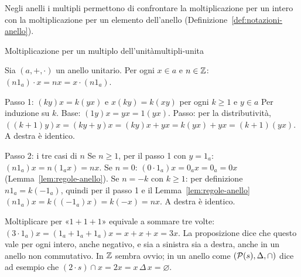 Negli anelli i multipli permettono di confrontare la moltiplicazione per un intero con la moltiplicazione per un elemento
dell'anello (Definizione~\ref{def:notazioni-anello}).

\begin{concetto}
\begin{Proposizione}{Moltiplicazione per un multiplo dell'unità}{multipli-unita}
    \begin{prerequisiti}
    \end{prerequisiti}
    Sia $(a, +, \cdot)$ un anello unitario. Per ogni $x \in a$ e $n \in \mathbb{Z}$: \quad $(n 1_a) \cdot x = nx = x \cdot (n 1_a)$.
\end{Proposizione}
\begin{dimostrazione}
    \begin{caso}{Passo 1: $(ky)x = k(yx)$ e $x(ky) = k(xy)$ per ogni $k \geq 1$ e $y \in a$}
        Per induzione su $k$. Base: $(1y)x = yx = 1(yx)$. Passo: per la distributività,
        $((k + 1)y)x = (ky + y)x = (ky)x + yx = k(yx) + yx = (k + 1)(yx)$. A destra è identico.
    \end{caso}
    \begin{caso}{Passo 2: i tre casi di $n$}
        Se $n \geq 1$, per il passo 1 con $y = 1_a$: $(n1_a)x = n(1_a x) = nx$. Se $n = 0$: $(0 \cdot 1_a)x = 0_a x = 0_a = 0x$ (Lemma~\ref{lem:regole-anello}).
        Se $n = -k$ con $k \geq 1$: per definizione $n1_a = k(-1_a)$, quindi per il passo 1 e il Lemma~\ref{lem:regole-anello}
        $(n1_a)x = k((-1_a)x) = k(-x) = nx$. A destra è identico.
    \end{caso}
\end{dimostrazione}
\end{concetto}

\begin{spiegazione}
    Moltiplicare per «$1 + 1 + 1$» equivale a sommare tre volte: $(3 \cdot 1_a)x = (1_a + 1_a + 1_a)x = x + x + x = 3x$. La proposizione
    dice che questo vale per ogni intero, anche negativo, e sia a sinistra sia a destra, anche in un anello non commutativo.
    In $\mathbb{Z}$ sembra ovvio; in un anello come $(\mathcal{P}(s), \Delta, \cap)$ dice ad esempio che $(2 \cdot s) \cap x = 2x = x \,\Delta\, x = \varnothing$.
\end{spiegazione}
